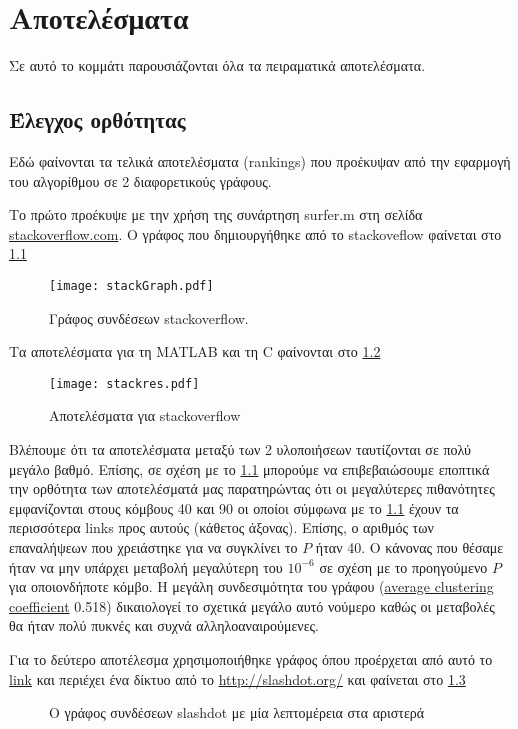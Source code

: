 \chapter{Αποτελέσματα}
Σε αυτό το κομμάτι παρουσιάζονται όλα τα πειραματικά αποτελέσματα.
\section{Έλεγχος ορθότητας}
Εδώ φαίνονται τα τελικά αποτελέσματα (rankings) που προέκυψαν από την εφαρμογή του αλγορίθμου σε 2 διαφορετικούς γράφους.

Το πρώτο προέκυψε με την χρήση της συνάρτηση surfer.m στη σελίδα \href{http://stackoverflow.com/}{stackoverflow.com}.
O γράφος που δημιουργήθηκε από το stackoveflow φαίνεται στο
\hyperref[fig:stackGraph]{\figurename{} \ref{fig:stackGraph}}
\begin{figure}[h]
	\centerline{\texttt{[image: stackGraph.pdf]}}
	\caption{Γράφος συνδέσεων stackoverflow.}
	\label{fig:stackGraph}
\end{figure}
 
Τα αποτελέσματα για τη MATLAB και τη C φαίνονται στο \hyperref[fig:stackres]{\figurename{} \ref{fig:stackres}}
\begin{figure}[h]
	\centerline{\texttt{[image: stackres.pdf]}}
	\caption{Αποτελέσματα για stackoverflow}
	\label{fig:stackres}
\end{figure}
 
Βλέπουμε ότι τα αποτελέσματα μεταξύ των 2 υλοποιήσεων ταυτίζονται σε πολύ μεγάλο βαθμό.
Επίσης, σε σχέση με το
\hyperref[fig:stackGraph]{\figurename{} \ref{fig:stackGraph}}
μπορούμε να επιβεβαιώσουμε  εποπτικά την ορθότητα των αποτελέσματά μας
παρατηρώντας ότι οι μεγαλύτερες πιθανότητες εμφανίζονται στους κόμβους 40 και 90
οι οποίοι  σύμφωνα με το 
\hyperref[fig:stackGraph]{\figurename{} \ref{fig:stackGraph}}
έχουν τα περισσότερα links προς αυτούς (κάθετος άξονας).
Επίσης, ο αριθμός των επαναλήψεων που χρειάστηκε για να συγκλίνει το $P$ ήταν 40.
Ο κάνονας που θέσαμε ήταν να μην υπάρχει μεταβολή μεγαλύτερη του $10^{-6}$ σε σχέση με το προηγούμενο $P$ για οποιονδήποτε κόμβο.
Η μεγάλη συνδεσιμότητα του γράφου
(\href{https://en.wikipedia.org/wiki/Clustering_coefficient#Global_clustering_coefficient}{average clustering coefficient} 0.518)
δικαιολογεί το σχετικά μεγάλο αυτό νούμερο καθώς οι μεταβολές θα ήταν πολύ πυκνές και συχνά αλληλοαναιρούμενες.

\newpage

Για το δεύτερο αποτέλεσμα χρησιμοποιήθηκε γράφος όπου προέρχεται από αυτό το
\href{http://snap.stanford.edu/data/soc-Slashdot0811.html}{link} 
και περιέχει ένα δίκτυο από το
\href{http://slashdot.org/}{http://slashdot.org/}
και φαίνεται στο
\hyperref[fig:slashGraph]{\figurename{} \ref{fig:slashGraph}}
\begin{figure}[h!]
	\centering
	\caption{O γράφος συνδέσεων slashdot με μία λεπτομέρεια στα αριστερά}
	\label{fig:slashGraph}
\end{figure}

